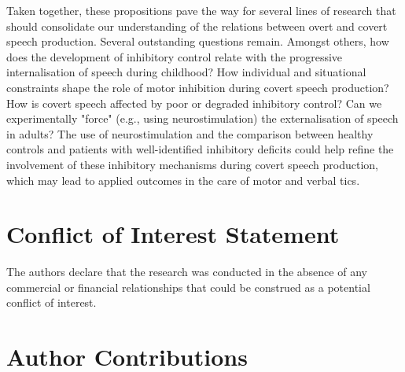 \documentclass[utf8]{template/frontiersSCNS} %
\begin{document}
Taken together, these propositions pave the way for several lines of research that should consolidate our understanding of the relations between overt and covert speech production. Several outstanding questions remain. Amongst others, how does the development of inhibitory control relate with the progressive internalisation of speech during childhood? How individual and situational constraints shape the role of motor inhibition during covert speech production? How is covert speech affected by poor or degraded inhibitory control? Can we experimentally "force" (e.g., using neurostimulation) the externalisation of speech in adults? The use of neurostimulation and the comparison between healthy controls and patients with well-identified inhibitory deficits could help refine the involvement of these inhibitory mechanisms during covert speech production, which may lead to applied outcomes in the care of motor and verbal tics.

\section*{Conflict of Interest Statement}


The authors declare that the research was conducted in the absence of any commercial or financial relationships that could be construed as a potential conflict of interest.

\section*{Author Contributions}


\end{document}
